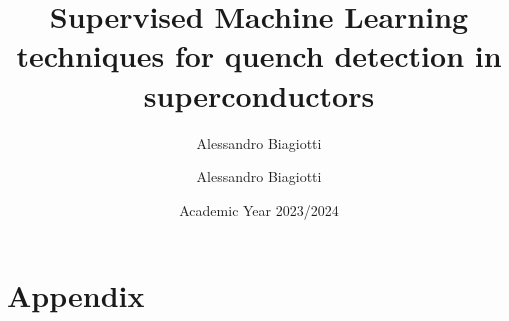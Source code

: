 \documentclass[a4paper]{book}
\title{\textsf{}}
\author{Alessandro Biagiotti}
\date{Academic Year 2023/2024}
\title{Supervised Machine Learning techniques for quench detection in superconductors}
\author{Alessandro Biagiotti}
\begin{document}
\makefrontpage

\frontmatter

\tableofcontents

\mainmatter

\setcounter{chapter}{-1}








\part*{Appendix}
\appendix


%

\printbibliography

\closingpage
\end{document}
